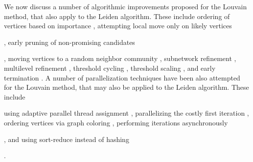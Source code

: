 We now discuss a number of algorithmic improvements proposed for the Louvain method, that also apply to the Leiden algorithm. These include ordering of vertices based on importance \cite{com-aldabobi22}, attempting local move only on likely vertices \cite{com-ryu16, com-zhang21, com-shi21}, early pruning of non-promising candidates \cite{com-ryu16, com-halappanavar17, com-zhang21, com-you22}, moving vertices to a random neighbor community \cite{com-traag15}, subnetwork refinement \cite{com-waltman13, com-traag19}, multilevel refinement \cite{com-rotta11, com-gach14, com-shi21}, threshold cycling \cite{com-ghosh18}, threshold scaling \cite{com-lu15, com-naim17, com-halappanavar17}, and early termination \cite{com-ghosh18}. A number of parallelization techniques have been also attempted for the Louvain method, that may also be applied to the Leiden algorithm. These include using adaptive parallel thread assignment \cite{com-fazlali17, com-naim17, com-sattar19, com-mohammadi20}, parallelizing the costly first iteration \cite{com-wickramaarachchi14}, ordering vertices via graph coloring \cite{com-halappanavar17}, performing iterations asynchronously \cite{com-shi21}, and using sort-reduce instead of hashing \cite{com-cheong13}.

